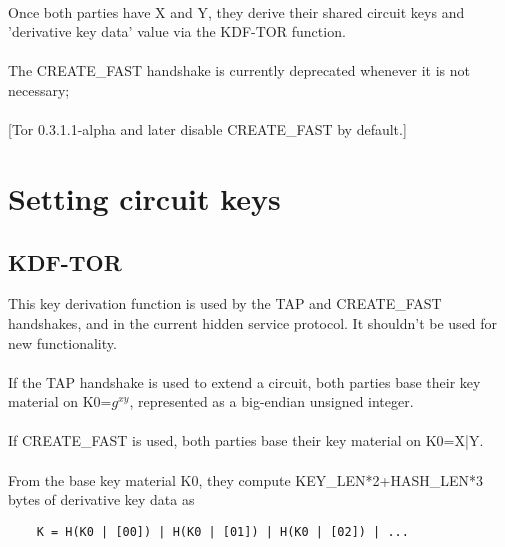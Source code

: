\paragraph{}
Once both parties have X and Y, they derive their shared circuit keys
and 'derivative key data' value via the KDF-TOR function.

\paragraph{}
The CREATE\_FAST handshake is currently deprecated whenever it is not
necessary;

\paragraph{}
[Tor 0.3.1.1-alpha and later disable CREATE\_FAST by default.]

\section{Setting circuit keys}

\subsection{KDF-TOR}
This key derivation function is used by the TAP and CREATE\_FAST
handshakes, and in the current hidden service protocol. It shouldn't
be used for new functionality.

\paragraph{}
If the TAP handshake is used to extend a circuit, both parties
base their key material on K0=$g^{xy}$, represented as a big-endian unsigned
integer.

\paragraph{}
If CREATE\_FAST is used, both parties base their key material on
K0=X|Y.

\paragraph{}
From the base key material K0, they compute KEY\_LEN*2+HASH\_LEN*3 bytes of
derivative key data as
\begin{verbatim}
    K = H(K0 | [00]) | H(K0 | [01]) | H(K0 | [02]) | ...
\end{verbatim}

